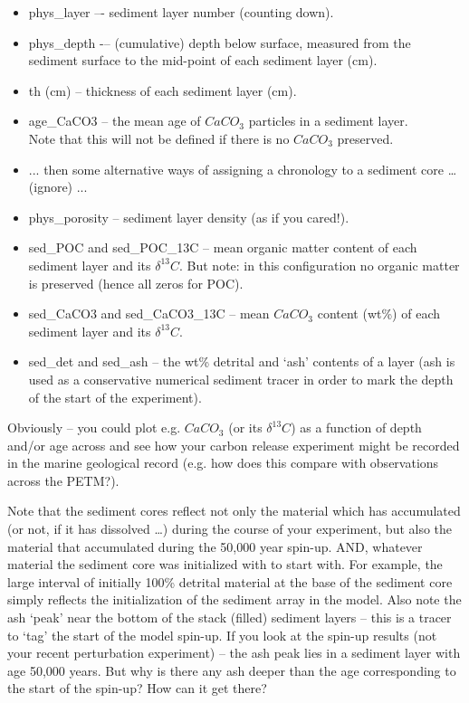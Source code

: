 \documentclass[11pt,fleqn]{book} %
\begin{document}
\vspace{1mm}
\begin{itemize}[noitemsep]
\item \textsf{\footnotesize phys\_layer } –- sediment layer number (counting down).
\item \textsf{\footnotesize phys\_depth } -– (cumulative) depth below surface, measured from the sediment surface to the mid-point of each sediment layer (cm).
\item \textsf{\footnotesize th (cm) } -- thickness of each sediment layer (cm).
\item \textsf{\footnotesize age\_CaCO3 } -- the mean age of \(CaCO_{3}\) particles in a sediment layer.
\\Note that this will not be defined if there is no \(CaCO_{3}\) preserved.
\item \textsf{\footnotesize ... } then some alternative ways of assigning a chronology to a sediment core … (ignore) ...
\item \textsf{\footnotesize phys\_porosity  } -- sediment layer density (as if you cared!).
\item \textsf{\footnotesize sed\_POC } and \textsf{\footnotesize sed\_POC\_13C } -- mean organic matter content of each sediment layer and its \(\delta^{13} C\). But note: in this configuration no organic matter is preserved (hence all zeros for POC).
\item \textsf{\footnotesize sed\_CaCO3} and \textsf{\footnotesize sed\_CaCO3\_13C } -- mean \(CaCO_{3}\) content (wt\%) of each sediment layer and its \(\delta^{13} C\).
\item \textsf{\footnotesize sed\_det } and \textsf{\footnotesize sed\_ash } -- the wt\% detrital and ‘ash’ contents of a layer (ash is used as a conservative numerical sediment tracer in order to mark the depth of the start of the experiment).
\end{itemize}
\vspace{1mm}

Obviously – you could plot e.g. \(CaCO_{3}\) (or its \(\delta^{13}C\)) as a function of depth and/or age across and see how your carbon release experiment might be recorded in the marine geological record (e.g. how does this compare with observations across the PETM?).

Note that the sediment cores reflect not only the material which has accumulated (or not, if it has dissolved …) during the course of your experiment, but also the material that accumulated during the 50,000 year spin-up. AND, whatever material the sediment core was initialized with to start with. For example, the large interval of initially 100\% detrital material at the base of the sediment core  simply reflects the initialization of the sediment array in the model. Also note the ash ‘peak’ near the bottom of the stack (filled) sediment layers – this is a tracer to ‘tag’ the start of the model spin-up. If you look at the spin-up results (not your recent perturbation experiment) – the ash peak lies in a sediment layer with age 50,000 years. But why is there any ash deeper than the age corresponding to the start of the spin-up? How can it get there?
\end{document}
